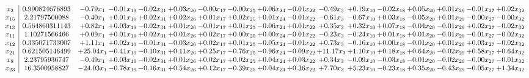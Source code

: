 \documentclass[9pt]{article}
\begin{document}
 \[\begin{array}{c| c c@{\hskip 2pt} c@{\hskip 2pt} c@{\hskip 2pt} c@{\hskip 2pt} c@{\hskip 2pt} c@{\hskip 2pt} c@{\hskip 2pt} c@{\hskip 2pt} c@{\hskip 2pt} c@{\hskip 2pt} c@{\hskip 2pt} c@{\hskip 2pt} c@{\hskip 2pt} c@{\hskip 2pt} c@{\hskip 2pt} }
 x_{2}   &  0.990824676893 & -0.79 x_{1} & -0.01 x_{19} & -0.02 x_{31} & +  0.03 x_{26} & -0.00 x_{17} & -0.00 x_{25} & +  0.06 x_{24} & -0.01 x_{22} & -0.49 x_{3} & +  0.19 x_{10} & -0.02 x_{18} & +  0.05 x_{20} & +  0.01 x_{29} & -0.01 x_{27} & +  0.02 x_{32}\\
 x_{15}   &  2.21797500088 & -0.40 x_{1} & +  0.01 x_{19} & +  0.02 x_{31} & +  0.02 x_{26} & +  0.01 x_{17} & +  0.02 x_{25} & +  0.01 x_{24} & -0.01 x_{22} & -0.61 x_{3} & -0.67 x_{10} & +  0.03 x_{18} & -0.05 x_{20} & +  0.01 x_{29} & -0.00 x_{27} & -0.00 x_{32}\\
 x_{13}   &  0.564860311143 & +  0.82 x_{1} & +  0.03 x_{19} & -0.02 x_{31} & +  0.01 x_{26} & -0.01 x_{17} & +  0.01 x_{25} & -0.06 x_{24} & +  0.01 x_{22} & +  0.35 x_{3} & +  0.32 x_{10} & +  0.07 x_{18} & -0.04 x_{20} & -0.01 x_{29} & +  0.02 x_{27} & -0.02 x_{32}\\
 x_{11}   &  1.10271566466 & +  0.09 x_{1} & +  0.01 x_{19} & +  0.02 x_{31} & +  0.01 x_{26} & +  0.02 x_{17} & +  0.00 x_{25} & +  0.00 x_{24} & -0.01 x_{22} & -0.23 x_{3} & -0.24 x_{10} & +  0.01 x_{18} & +  0.01 x_{20} & -0.01 x_{29} & -0.01 x_{27} & -0.02 x_{32}\\
 x_{12}   &  0.335071733007 & +  1.11 x_{1} & +  0.02 x_{19} & -0.01 x_{31} & -0.03 x_{26} & +  0.02 x_{17} & +  0.01 x_{25} & -0.05 x_{24} & -0.01 x_{22} & +  0.73 x_{3} & -0.16 x_{10} & +  0.00 x_{18} & -0.01 x_{20} & +  0.01 x_{29} & +  0.03 x_{27} & -0.02 x_{32}\\
 x_{21}   &  0.621505146499 & + 25.04 x_{1} & -0.41 x_{19} & -0.10 x_{31} & +  0.11 x_{26} & +  0.25 x_{17} & -0.76 x_{25} & -0.96 x_{24} & -0.09 x_{22} & + 11.17 x_{3} & +  1.10 x_{10} & +  0.18 x_{18} & +  0.64 x_{20} & -0.02 x_{29} & +  0.58 x_{27} & +  0.64 x_{32}\\
 x_{8}   &  2.23795936747 & -0.49 x_{1} & +  0.03 x_{19} & -0.02 x_{31} & +  0.01 x_{26} & +  0.02 x_{17} & +  0.02 x_{25} & +  0.04 x_{24} & +  0.03 x_{22} & +  0.34 x_{3} & -0.09 x_{10} & -0.03 x_{18} & -0.01 x_{20} & -0.02 x_{29} & -0.00 x_{27} & -0.01 x_{32}\\
 x_{23}   &  16.3500958827 & -24.03 x_{1} & -0.78 x_{19} & -0.16 x_{31} & +  0.54 x_{26} & +  0.12 x_{17} & -0.39 x_{25} & +  0.04 x_{24} & +  0.36 x_{22} & +  7.70 x_{3} & +  5.23 x_{10} & -0.23 x_{18} & +  0.35 x_{20} & -0.43 x_{29} & -0.05 x_{27} & +  1.34 x_{32}\\

\end{array}\]
\end{document}
